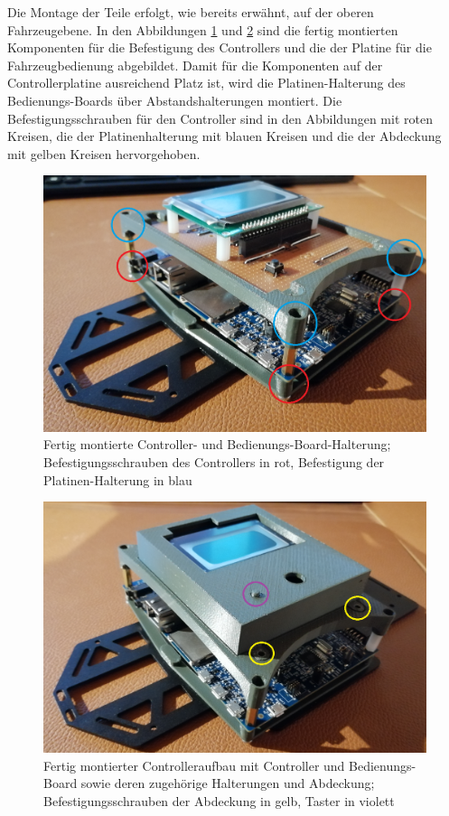 Die Montage der Teile erfolgt, wie bereits erwähnt, auf der oberen Fahrzeugebene. In den Abbildungen \ref{fig:ControllerMontage} und \ref{fig:AbdeckungMontage} sind die fertig montierten Komponenten für die Befestigung des Controllers und die der Platine für die Fahrzeugbedienung abgebildet. Damit für die Komponenten auf der Controllerplatine ausreichend Platz ist, wird die Platinen-Halterung des Bedienungs-Boards über Abstandshalterungen montiert. Die Befestigungsschrauben für den Controller sind in den Abbildungen mit roten Kreisen, die der Platinenhalterung mit blauen Kreisen und die der Abdeckung mit gelben Kreisen hervorgehoben.

\begin{figure}[H] %
\includegraphics[width=.85\textwidth]{sec2/images/3DAnbaukomponenten/Montagebilder/ControllerMontage} 
\centering
\captionsetup{width=.95\textwidth}
\caption[Fertig montierte Controller- und Bedienungs-Board-Halterung]{Fertig montierte Controller- und Bedienungs-Board-Halterung; Befestigungsschrauben des Controllers in rot, Befestigung der Platinen-Halterung in blau}\centering
\label{fig:ControllerMontage}
\end{figure}

\begin{figure}[H] %
\includegraphics[width=.85\textwidth]{sec2/images/3DAnbaukomponenten/Montagebilder/AbdeckungMontage} 
\centering
\captionsetup{width=.95\textwidth}
\caption[Fertig montierte Controller- und Bedienungs-Board-Halterung mit Abdeckung]{Fertig montierter Controlleraufbau mit Controller und Bedienungs-Board sowie deren zugehörige Halterungen und Abdeckung; Befestigungsschrauben der Abdeckung in gelb, Taster in violett}\centering
\label{fig:AbdeckungMontage}
\end{figure}


